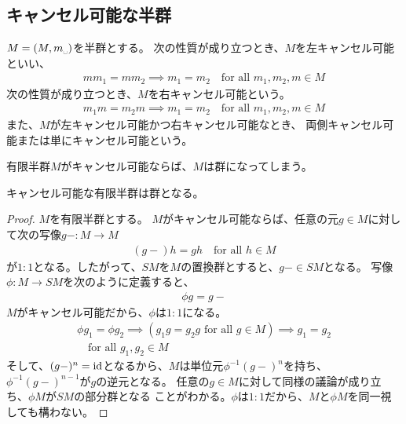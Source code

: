 \subsection{キャンセル可能な半群}\label{s2:キャンセル可能な半群} %
	\begin{definition}[キャンセル可能な半群]\label{def:キャンセル可能な半群} %
		$M=(M,m_\myspace)$を半群とする。
		次の性質が成り立つとき、$M$を左キャンセル可能といい、
		\begin{equation*}\begin{split}
			mm_1 = mm_2 \implies m_1 = m_2 \quad\text{for all }m_1,m_2,m\in M
		\end{split}\end{equation*}
		次の性質が成り立つとき、$M$を右キャンセル可能という。
		\begin{equation*}\begin{split}
			m_1m = m_2m \implies m_1 = m_2 \quad\text{for all }m_1,m_2,m\in M
		\end{split}\end{equation*}
		また、$M$が左キャンセル可能かつ右キャンセル可能なとき、
		両側キャンセル可能または単にキャンセル可能という。
	\end{definition} %

	有限半群$M$がキャンセル可能ならば、$M$は群になってしまう。

	\begin{proposition}[キャンセル可能な有限半群]\label{prop:キャンセル可能な有限半群} %
		キャンセル可能な有限半群は群となる。
	\end{proposition} %
	\begin{proof} $M$を有限半群とする。
	$M$がキャンセル可能ならば、任意の元$g\in M$に対して次の写像$g-:M\to M$
	\begin{equation*}\begin{split}
		(g-)h = gh \quad\text{for all }h\in M
	\end{split}\end{equation*}
	が$1:1$となる。したがって、$SM$を$M$の置換群とすると、$g-\in SM$となる。
	写像$\phi:M\to SM$を次のように定義すると、
	\begin{equation*}\begin{split}
		\phi g = g-
	\end{split}\end{equation*}
	$M$がキャンセル可能だから、$\phi$は$1:1$になる。
	\begin{equation*}\begin{split}
		\phi g_1 = \phi g_2
		\implies (g_1g = g_2g \text{ for all }g\in M)
		\implies g_1 = g_2 \\
		\quad\text{for all }g_1,g_2\in M
	\end{split}\end{equation*}
	そして、$(g-)^n={\operatorname{id}}$となるから、$M$は単位元$\phi^{-1}(g-)^n$を持ち、
	$\phi^{-1}(g-)^{n-1}$が$g$の逆元となる。
	任意の$g\in M$に対して同様の議論が成り立ち、$\phi M$が$SM$の部分群となる
	ことがわかる。$\phi$は$1:1$だから、$M$と$\phi M$を同一視しても構わない。
	\end{proof}
\endgroup %
